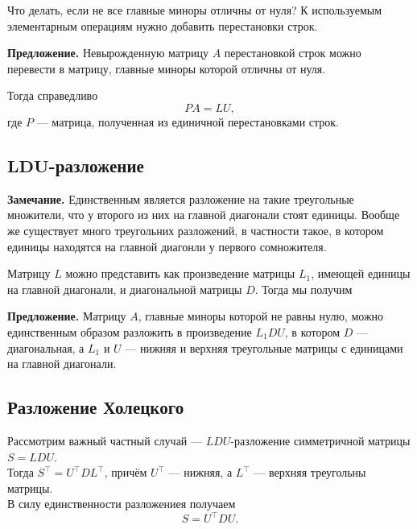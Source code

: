 \documentclass[11pt,a4paper]{article}
\begin{document}
Что делать, если не все главные миноры отличны от нуля? К используемым
элементарным операциям нужно добавить перестановки строк.

\textbf{Предложение.} Невырожденную матрицу \(A\) перестановкой строк
можно перевести в матрицу, главные миноры которой отличны от нуля.

Тогда справедливо \[ PA = LU,\] где \(P\) --- матрица, полученная из
единичной перестановками строк.

    \hypertarget{mathbfldu-ux440ux430ux437ux43bux43eux436ux435ux43dux438ux435}{%
\subsection{\texorpdfstring{\(\mathbf{LDU}\)-разложение}{\textbackslash{}mathbf\{LDU\}-разложение}}\label{mathbfldu-ux440ux430ux437ux43bux43eux436ux435ux43dux438ux435}}

\textbf{Замечание.} Единственным является разложение на такие
треугольные множители, что у второго из них на главной диагонали стоят
единицы. Вообще же существует много треугольних разложений, в частности
такое, в котором единицы находятся на главной диагонли у первого
сомножителя.

Матрицу \(L\) можно представить как произведение матрицы \(L_1\),
имеющей единицы на главной диагонали, и диагональной матрицы \(D\).
Тогда мы получим

\textbf{Предложение.} Матрицу \(A\), главные миноры которой не равны
нулю, можно единственным образом разложить в произведение \(L_1 D U\), в
котором \(D\) --- диагональная, а \(L_1\) и \(U\) --- нижняя и верхняя
треугольные матрицы с единицами на главной диагонали.

    \hypertarget{ux440ux430ux437ux43bux43eux436ux435ux43dux438ux435-ux445ux43eux43bux435ux446ux43aux43eux433ux43e}{%
\subsection{Разложение
Холецкого}\label{ux440ux430ux437ux43bux43eux436ux435ux43dux438ux435-ux445ux43eux43bux435ux446ux43aux43eux433ux43e}}

Рассмотрим важный частный случай --- \(LDU\)-разложение симметричной
матрицы \(S = LDU\).\\
Тогда \(S^\top = U^\top D L^\top\), причём \(U^\top\) --- нижняя, а
\(L^\top\) --- верхняя треугольны матрицы.\\
В силу единственности разложениея получаем \[ S = U^\top D U. \]
\end{document}
